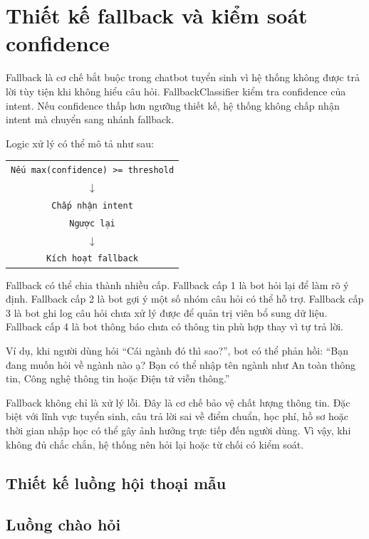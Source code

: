 \section{Thiết kế fallback và kiểm soát confidence}

Fallback là cơ chế bắt buộc trong chatbot tuyển sinh vì hệ thống không được trả lời tùy tiện khi không hiểu câu hỏi. FallbackClassifier kiểm tra confidence của intent. Nếu confidence thấp hơn ngưỡng thiết kế, hệ thống không chấp nhận intent mà chuyển sang nhánh fallback.

Logic xử lý có thể mô tả như sau:

\begin{center}
\begin{tabular}{c}
\texttt{Nếu max(confidence) >= threshold} \\
$\downarrow$ \\
\texttt{Chấp nhận intent} \\
\texttt{Ngược lại} \\
$\downarrow$ \\
\texttt{Kích hoạt fallback}
\end{tabular}
\end{center}

Fallback có thể chia thành nhiều cấp. Fallback cấp 1 là bot hỏi lại để làm rõ ý định. Fallback cấp 2 là bot gợi ý một số nhóm câu hỏi có thể hỗ trợ. Fallback cấp 3 là bot ghi log câu hỏi chưa xử lý được để quản trị viên bổ sung dữ liệu. Fallback cấp 4 là bot thông báo chưa có thông tin phù hợp thay vì tự trả lời.

Ví dụ, khi người dùng hỏi ``Cái ngành đó thì sao?'', bot có thể phản hồi: ``Bạn đang muốn hỏi về ngành nào ạ? Bạn có thể nhập tên ngành như An toàn thông tin, Công nghệ thông tin hoặc Điện tử viễn thông.''

Fallback không chỉ là xử lý lỗi. Đây là cơ chế bảo vệ chất lượng thông tin. Đặc biệt với lĩnh vực tuyển sinh, câu trả lời sai về điểm chuẩn, học phí, hồ sơ hoặc thời gian nhập học có thể gây ảnh hưởng trực tiếp đến người dùng. Vì vậy, khi không đủ chắc chắn, hệ thống nên hỏi lại hoặc từ chối có kiểm soát.

\subsection*{Thiết kế luồng hội thoại mẫu}

\subsection*{Luồng chào hỏi}


